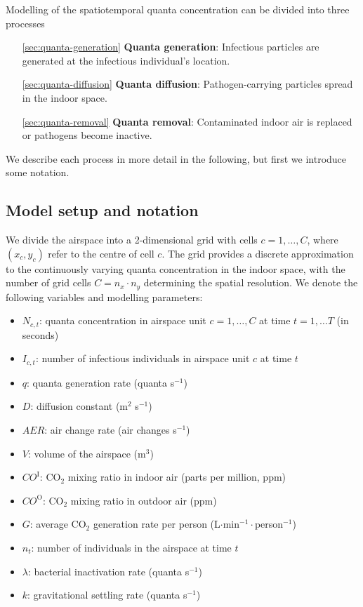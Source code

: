 \documentclass[fleqn,11pt]{wlscirep_supp}
\begin{document}
Modelling of the spatiotemporal quanta concentration can be divided into three processes
\begin{itemize}
    \item[\ref{sec:quanta-generation}] \textbf{Quanta generation}: Infectious particles are generated at the infectious individual's location. 
    \item[\ref{sec:quanta-diffusion}] \textbf{Quanta diffusion}: Pathogen-carrying particles spread in the indoor space. 
    \item[\ref{sec:quanta-removal}] \textbf{Quanta removal}: Contaminated indoor air is replaced or pathogens become inactive. 
\end{itemize}
We describe each process in more detail in the following, but first we introduce some notation. 

\subsection{Model setup and notation}

We divide the airspace into a 2-dimensional grid with cells $c = 1, \dots, C$, where $(x_c, y_c)$ refer to the centre of cell $c$. The grid provides a discrete approximation to the continuously varying quanta concentration in the indoor space, with the number of grid cells $C = n_x \cdot n_y$ determining the spatial resolution. We denote the following variables and modelling parameters:
\begin{itemize}
    \item $N_{c,t}$: quanta concentration in airspace unit $c = 1, \dots, C$ at time $t = 1, \dots T$ (in seconds)
    \item $I_{c,t}$: number of infectious individuals in airspace unit $c$ at time $t$
    \item $q$: quanta generation rate (quanta s$^{-1}$)
    \item $D$: diffusion constant (m$^2$ s$^{-1}$)
    \item $AER$: air change rate (air changes s$^{-1}$)
    \item $V$: volume of the airspace (m$^3$)
    \item $CO^{\text{I}}$: CO$_2$ mixing ratio in indoor air (parts per million, ppm)
    \item $CO^{\text{O}}$: CO$_2$ mixing ratio in outdoor air (ppm)
    \item $G$: average CO$_2$ generation rate per person (L$\cdot$min$^{-1}\cdot$person$^{-1}$)
    \item $n_t$: number of individuals in the airspace at time $t$
    \item $\lambda$: bacterial inactivation rate (quanta s$^{-1}$)
    \item $k$: gravitational settling rate (quanta s$^{-1}$)
\end{itemize}
\end{document}
